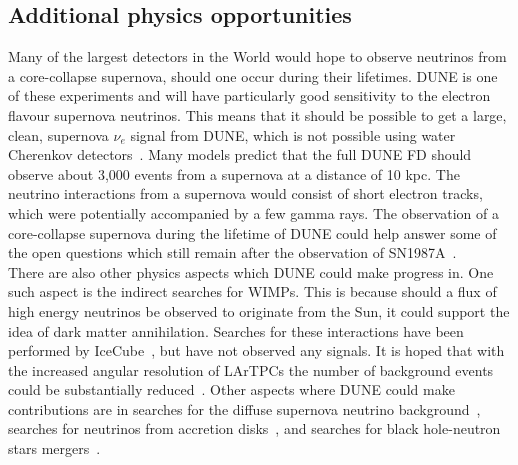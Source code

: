 \subsection{Additional physics opportunities} \label{sec:DUNE_Other}%
Many of the largest detectors in the World would hope to observe neutrinos from a core-collapse supernova, should one occur during their lifetimes. DUNE is one of these experiments and will have particularly good sensitivity to the electron flavour supernova neutrinos. This means that it should be possible to get a large, clean, supernova $\nu_e$ signal from DUNE, which is not possible using water Cherenkov detectors~\citep{KScholSND, Laha:2013hva}. Many models predict that the full DUNE FD should observe about 3,000 events from a supernova at a distance of 10 kpc. The neutrino interactions from a supernova would consist of short electron tracks, which were potentially accompanied by a few gamma rays. The observation of a core-collapse supernova during the lifetime of DUNE could help answer some of the open questions which still remain after the observation of SN1987A~\citep{PhysRevLett.58.1494, PhysRevLett.58.1490}. \\

There are also other physics aspects which DUNE could make progress in. One such aspect is the indirect searches for WIMPs. This is because should a flux of high energy neutrinos be observed to originate from the Sun, it could support the idea of dark matter annihilation. Searches for these interactions have been performed by IceCube~\citep{Aartsen:2012kia, Choi:2015ara}, but have not observed any signals. It is hoped that with the increased angular resolution of LArTPCs the number of background events could be substantially reduced~\citep{DUNECDR_V2}. Other aspects where DUNE could make contributions are in searches for the diffuse supernova neutrino background~\citep{Beacom:2010kk}, searches for neutrinos from accretion disks~\citep{Caballero:2011dw}, and searches for black hole-neutron stars mergers~\citep{Caballero:2009ww}. \\

